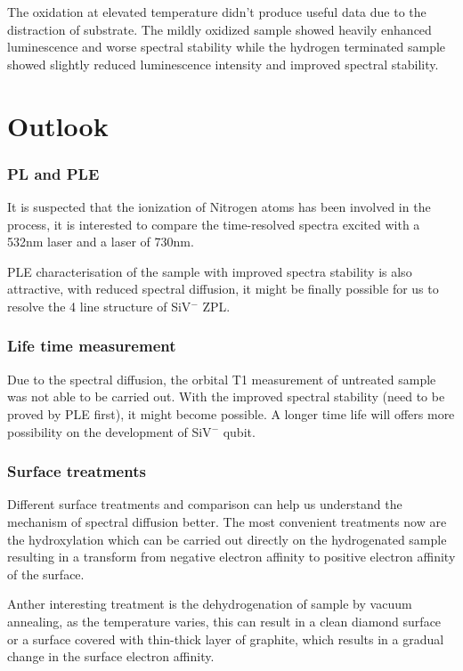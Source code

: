 The oxidation at elevated temperature didn't produce useful data due to the distraction of substrate. The mildly oxidized sample showed heavily enhanced luminescence and worse spectral stability while the hydrogen terminated sample showed slightly reduced luminescence intensity and improved spectral stability.

\section{ Outlook}

\subsubsection{PL and PLE}
It is suspected that the ionization of Nitrogen atoms has been involved in the process, it is interested to compare the time-resolved spectra excited with a 532nm laser and a laser of 730nm.

PLE characterisation of the sample with improved spectra stability is also attractive, with reduced spectral diffusion, it might be finally possible for us to resolve the 4 line structure of SiV$^{-}$ ZPL.

\subsubsection{Life time measurement}
Due to the spectral diffusion, the orbital T1 measurement of untreated sample was not able to be carried out. With the improved spectral stability (need to be proved by PLE first), it might become possible. A longer time life will offers more possibility on the development of SiV$^{-}$ qubit.

\subsubsection{Surface treatments}

Different surface treatments and comparison can help us understand the mechanism of spectral diffusion better. The most convenient treatments now are the hydroxylation which can be carried out directly on the hydrogenated sample resulting in a transform from negative electron affinity to positive electron affinity of the surface.

Anther interesting treatment is the dehydrogenation of sample by vacuum annealing, as the temperature varies, this can result in a clean diamond surface or a surface covered with thin-thick layer of graphite, which results in a gradual change in the surface electron affinity. \citep{diederich_electron_1998,maier_electron_2001}

